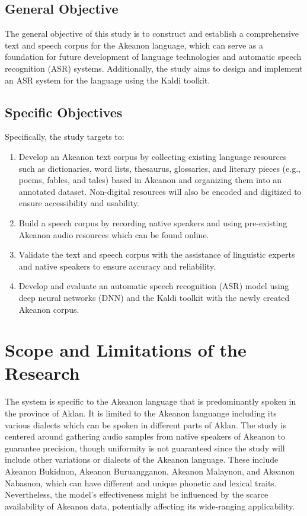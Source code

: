 \subsection{General Objective}
\label{sec:generalobjective}

The general objective of this study is to construct and establish a comprehensive text and speech corpus for the Akeanon language, which can serve as a foundation for future development of language technologies and automatic speech recognition (ASR) systems. Additionally, the study aims to design and implement an ASR system for the language using the Kaldi toolkit.

\subsection{Specific Objectives}
\label{sec:specificobjectives}

Specifically, the study targets to:
\begin{enumerate}
    \item Develop an Akeanon text corpus by collecting existing language resources such as dictionaries, word lists, thesaurus, glossaries, and literary pieces (e.g., poems, fables, and tales) based in Akeanon and organizing them into an annotated dataset. Non-digital resources will also be encoded and digitized to ensure accessibility and usability.
    \item Build a speech corpus by recording native speakers and using pre-existing Akeanon audio resources which can be found online.
    \item Validate the text and speech corpus with the assistance of linguistic experts and native speakers to ensure accuracy and reliability.
    \item Develop and evaluate an automatic speech recognition (ASR) model using deep neural networks (DNN) and the Kaldi toolkit with the newly created Akeanon corpus.
 \end{enumerate}
 
\section{Scope and Limitations of the Research}
\label{sec:scopelimitations}

The system is specific to the Akeanon language that is predominantly spoken in the province of Aklan. It is limited to the Akeanon languange including its various dialects which can be spoken in different parts of Aklan. The study is centered around gathering audio samples from native speakers of Akeanon to guarantee precision, though uniformity is not guaranteed since the study will include other variations or dialects of the Akeanon language. These include Akeanon Bukidnon, Akeanon Buruangganon, Akeanon Malaynon, and Akeanon Nabasnon, which can have different and unique phonetic and lexical traits. Nevertheless, the model's effectiveness might be influenced by the scarce availability of Akeanon data, potentially affecting its wide-ranging applicability.


